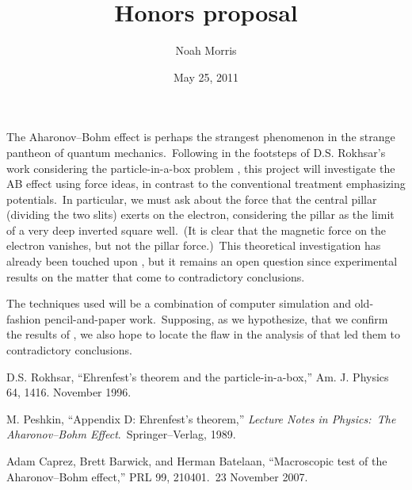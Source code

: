 \documentclass[11pt]{amsart}
\title{Honors proposal}
\author{Noah Morris}
\date{May 25, 2011}
\begin{document}
\maketitle

The Aharonov--Bohm effect is perhaps the strangest phenomenon in the strange pantheon of quantum mechanics.\ Following in the footsteps of D.S. Rokhsar's work considering the particle-in-a-box problem \cite{rokhsar}, this project will investigate the AB effect using force ideas, in contrast to the conventional treatment emphasizing potentials.\ In particular, we must ask about the force that the central pillar (dividing the two slits) exerts on the electron, considering the pillar as the limit of a very deep inverted square well.\ (It is clear that the magnetic force on the electron vanishes, but not the pillar force.)\ This theoretical investigation has already been touched upon \cite{peshkin}, but it remains an open question since experimental results on the matter \cite{caprez} that come to contradictory conclusions.

The techniques used will be a combination of computer simulation and old-fashion pencil-and-paper work.\ Supposing, as we hypothesize, that we confirm the results of \cite{peshkin}, we also hope to locate the flaw in the analysis of \cite{caprez} that led them to contradictory conclusions.\\

\begin{thebibliography}{9}

  D.S. Rokhsar,
  ``Ehrenfest's theorem and the particle-in-a-box,''
  Am. J. Physics 64, 1416.
  November 1996.

  M. Peshkin,
  ``Appendix D: Ehrenfest's theorem,''
  \emph{Lecture Notes in Physics:\ The Aharonov--Bohm Effect}.\ Springer--Verlag,
  1989.

  Adam Caprez, Brett Barwick, and Herman Batelaan,
  ``Macroscopic test of the Aharonov--Bohm effect,''
  PRL 99, 210401.\ 23 November 2007.

\end{thebibliography}
\end{document}
